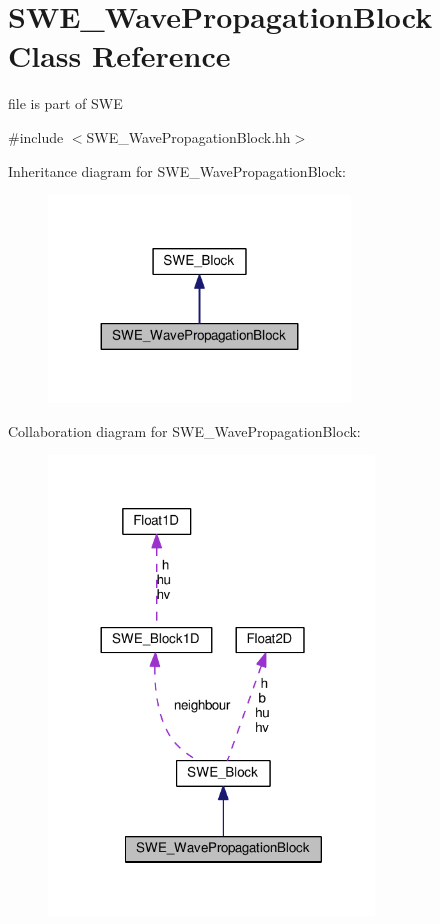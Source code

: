 \hypertarget{classSWE__WavePropagationBlock}{}\section{S\+W\+E\+\_\+\+Wave\+Propagation\+Block Class Reference}
\label{classSWE__WavePropagationBlock}


file is part of S\+WE  




{\ttfamily \#include $<$S\+W\+E\+\_\+\+Wave\+Propagation\+Block.\+hh$>$}



Inheritance diagram for S\+W\+E\+\_\+\+Wave\+Propagation\+Block\+:\nopagebreak
\begin{figure}[H]
\begin{center}
\leavevmode
\includegraphics[width=227pt]{classSWE__WavePropagationBlock__inherit__graph}
\end{center}
\end{figure}


Collaboration diagram for S\+W\+E\+\_\+\+Wave\+Propagation\+Block\+:\nopagebreak
\begin{figure}[H]
\begin{center}
\leavevmode
\includegraphics[width=245pt]{classSWE__WavePropagationBlock__coll__graph}
\end{center}
\end{figure}
